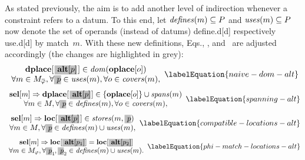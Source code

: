 As stated previously, the aim is to add another level of indirection whenever a
\gls{constraint} refers to a \gls{datum}.
%
To this end, let \mbox{$\mDefines(m) \subseteq \mOperandSet$} and
\mbox{$\mUses(m) \subseteq \mOperandSet$} now denote the set of \glspl{operand}
(instead of \glspl{datum}) \gls{define.d}[d] respectively \gls{use.d}[d] by
\gls{match}~$m$.
%
With these new definitions, Eqs.\thinspace{},
, and~ are adjusted
accordingly (the changes are highlighted in grey):
%
\begin{equation}
  \begin{array}{c}
    \mVar{dplace}[\hlDiff{\mVar{alt}[p]}[1pt]] \in \mDom(\mVar{oplace}[o]) \\
    \forall m \in \mPhiMatchCompSet,
    \forall \hlDiff{p} \in \mUses(m),
    \forall o \in \mCovers(m),
  \end{array}
  \labelEquation{naive-dom-alt}
\end{equation}
%
\begin{equation}
  \begin{array}{c}
    \mVar{sel}[m]
    \mImp
    \mVar{dplace}[\hlDiff{\mVar{alt}[p]}[1pt]] \in
      \mSet{\mVar{oplace}[o]} \cup \mSpans(m) \\
    \forall m \in \mMatchSet,
    \forall \hlDiff{p} \in \mDefines(m),
    \forall o \in \mCovers(m),
  \end{array}
  \labelEquation{spanning-alt}
\end{equation}
%
\begin{equation}
  \begin{array}{c}
    \mVar{sel}[m]
    \mImp
    \mVar{loc}[\hlDiff{\mVar{alt}[p]}[1pt]] \in \mStores(m, \hlDiff{p}) \\
    \forall m \in \mMatchSet,
    \forall \hlDiff{p} \in \mDefines(m) \cup \mUses(m),
  \end{array}
  \labelEquation{compatible-locations-alt}
\end{equation}
%
\begin{equation}
  \begin{array}{c}
    \mVar{sel}[m]
    \mImp
    \mVar{loc}[\hlDiff{\mVar{alt}[p_1]}] = \mVar{loc}[\hlDiff{\mVar{alt}[p_2]}]
    \\
    \forall m \in \mPhiMatchSet,
    \forall \hlDiff{p}_1 \hspace{-.8pt}, \hlDiff{p}_2 \in
      \mDefines(m) \cup \mUses(m).
  \end{array}
  \labelEquation{phi-match-locations-alt}
\end{equation}

